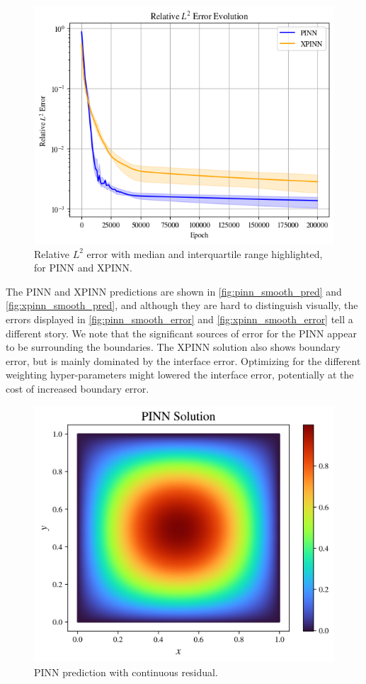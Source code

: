 \begin{figure}[h!]
    \centering
    \includegraphics[width = 0.8\linewidth]{Project1XPINNs/figures/Poisson/Relative_L2_smooth_Adam.png}
    \caption{Relative $L^2$ error with median and interquartile range highlighted, for PINN and XPINN.}
    \label{fig:rel_l2_smooth_poisson}
\end{figure}

The PINN and XPINN predictions are shown in \autoref{fig:pinn_smooth_pred} and \autoref{fig:xpinn_smooth_pred}, and although they are hard to distinguish visually, the errors displayed in \autoref{fig:pinn_smooth_error} and \autoref{fig:xpinn_smooth_error} tell a different story.
We note that the significant sources of error for the PINN appear to be surrounding the boundaries.
The XPINN solution also shows boundary error, but is mainly dominated by the interface error.
Optimizing for the different weighting hyper-parameters might lowered the interface error, potentially at the cost of increased boundary error.

\begin{figure}[h]
    \centering
    \includegraphics[width=0.7\linewidth]{Project1XPINNs/figures/Poisson/smooth_single_Poisson_solution.png}
    \caption{PINN prediction with continuous residual.}
    \label{fig:pinn_smooth_pred}
\end{figure}

